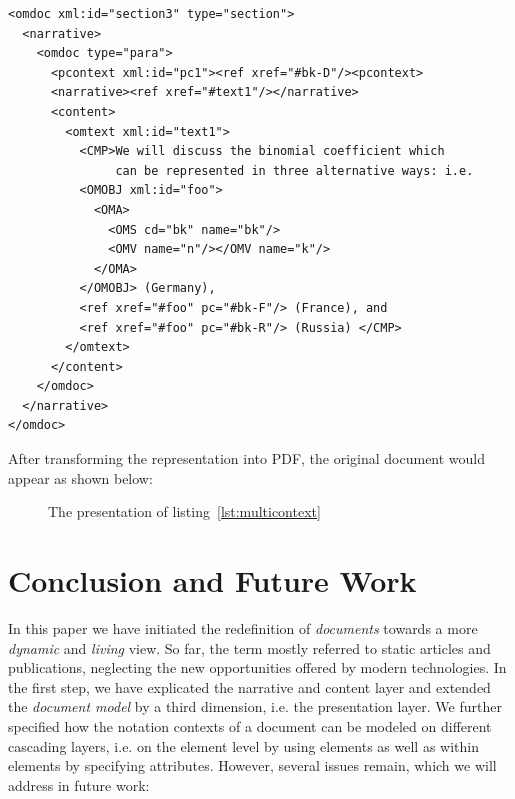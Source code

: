 \documentclass[a4paper]{article}
\begin{document}
\begin{lstlisting}[mathescape,numbers=none,caption={A Multi-context
Presentation},label=lst:multicontext]
<omdoc xml:id="section3" type="section">
  <narrative>
    <omdoc type="para">
      <pcontext xml:id="pc1"><ref xref="#bk-D"/><pcontext>
      <narrative><ref xref="#text1"/></narrative>
      <content>
        <omtext xml:id="text1">
          <CMP>We will discuss the binomial coefficient which 
               can be represented in three alternative ways: i.e. 
          <OMOBJ xml:id="foo">
            <OMA>
              <OMS cd="bk" name="bk"/>
              <OMV name="n"/></OMV name="k"/>
            </OMA>
          </OMOBJ> (Germany), 
          <ref xref="#foo" pc="#bk-F"/> (France), and 
          <ref xref="#foo" pc="#bk-R"/> (Russia) </CMP>
        </omtext>
      </content>
    </omdoc>
  </narrative>
</omdoc>
\end{lstlisting}

After transforming the {\omdoc} representation into PDF, the original document would
appear as shown below:
\begin{figure}[ht]
\begin{center}
\caption{The presentation of listing~\ref{lst:multicontext}}
\end{center}
\end{figure}
\vspace{-1.0em}

\section{Conclusion and Future Work}\label{sec:outlook}

In this paper we have initiated the redefinition of {\emph{documents}} towards a more
{\emph{dynamic}} and {\emph{living}} view. So far, the term mostly referred to static
articles and publications, neglecting the new opportunities offered by modern
technologies.  In the first step, we have explicated the narrative and content layer and
extended the {\emph{document model}} by a third dimension, i.e. the presentation layer. We
further specified how the notation contexts of a document can be modeled on different
cascading layers, i.e. on the {} element level by using
{} elements as well as within {} elements by specifying
{} attributes. However, several issues remain, which we will address in
future work:
\end{document}

